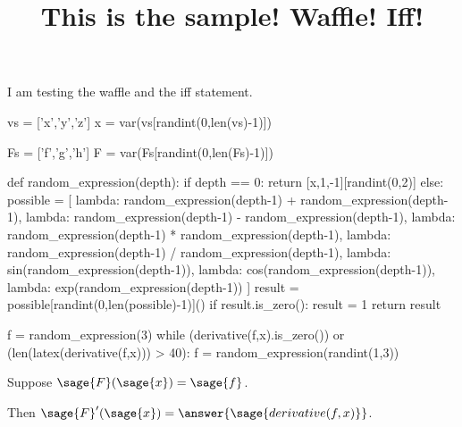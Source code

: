 \documentclass{ximera}
\title[Breal-grond]{This is the sample! Waffle!  Iff!}
\begin{document}

I am testing the waffle and the iff statement.

\begin{sagesilent}
  vs = ['x','y','z']
  x = var(vs[randint(0,len(vs)-1)])

  Fs = ['f','g','h']
  F = var(Fs[randint(0,len(Fs)-1)])
  
  def random_expression(depth):
    if depth == 0:
      return [x,1,-1][randint(0,2)]
    else:
      possible = [
        lambda: random_expression(depth-1) + random_expression(depth-1),
        lambda: random_expression(depth-1) - random_expression(depth-1),
        lambda: random_expression(depth-1) * random_expression(depth-1),
        lambda: random_expression(depth-1) / random_expression(depth-1),
        lambda: sin(random_expression(depth-1)),
        lambda: cos(random_expression(depth-1)),
        lambda: exp(random_expression(depth-1))
      ]
      result = possible[randint(0,len(possible)-1)]()
      if result.is_zero():
        result = 1
      return result

  f = random_expression(3)
  while (derivative(f,x).is_zero()) or (len(latex(derivative(f,x))) > 40):
    f = random_expression(randint(1,3))
\end{sagesilent}

\begin{exercise}

  Suppose $\sage{F}(\sage{x}) = \sage{f}$.

  Then $\sage{F}'(\sage{x}) = \answer{\sage{derivative(f,x)}}$.

\end{exercise}
\end{document}
